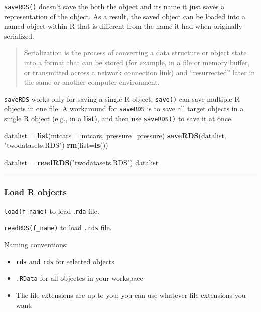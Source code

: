 \documentclass[
  a4paper,
  twoside,
  openright]{book}
\newenvironment{Shaded}{\begin{snugshade}}{\end{snugshade}}
\newcommand{\AttributeTok}[1]{\textcolor[rgb]{0.13,0.29,0.53}{#1}}
\newcommand{\FunctionTok}[1]{\textcolor[rgb]{0.13,0.29,0.53}{\textbf{#1}}}
\newcommand{\NormalTok}[1]{#1}
\newcommand{\OtherTok}[1]{\textcolor[rgb]{0.56,0.35,0.01}{#1}}
\newcommand{\StringTok}[1]{\textcolor[rgb]{0.31,0.60,0.02}{#1}}
\providecommand{\tightlist}{%
  \setlength{\itemsep}{0pt}\setlength{\parskip}{0pt}}
\theoremstyle{definition}
\theoremstyle{definition}
\theoremstyle{definition}
\theoremstyle{definition}
\theoremstyle{remark}
\begin{document}
\texttt{saveRDS()} doesn't save the both the object and its name it just saves a representation of the object. As a result, {the saved object can be loaded into a named object} within R that is different from the name it had when originally serialized.

\begin{quote}
Serialization is the process of converting a data structure or object state into a format that can be stored (for example, in a file or memory buffer, or transmitted across a network connection link) and ``resurrected'' later in the same or another computer environment.
\end{quote}

\texttt{saveRDS} works only for {saving a single R object}, \texttt{save()} can save multiple R objects in one file. A workaround for \texttt{saveRDS} is to save all target objects in a single R object (e.g., in a \textbf{list}), and then use \texttt{saveRDS()} to save it at once.

\begin{Shaded}
\begin{Highlighting}[]
\NormalTok{datalist }\OtherTok{=} \FunctionTok{list}\NormalTok{(}\AttributeTok{mtcars =}\NormalTok{ mtcars, }\AttributeTok{pressure=}\NormalTok{pressure)}
\FunctionTok{saveRDS}\NormalTok{(datalist, }\StringTok{"twodatasets.RDS"}\NormalTok{)}
\FunctionTok{rm}\NormalTok{(}\AttributeTok{list=}\FunctionTok{ls}\NormalTok{())}

\NormalTok{datalist }\OtherTok{=} \FunctionTok{readRDS}\NormalTok{(}\StringTok{"twodatasets.RDS"}\NormalTok{)}
\NormalTok{datalist}
\end{Highlighting}
\end{Shaded}

\begin{center}\rule{0.5\linewidth}{0.5pt}\end{center}

\subsubsection*{Load R objects}\label{load-r-objects}

\texttt{load(f\_name)} to load .\texttt{rda} file.

\texttt{readRDS(f\_name)} to load \texttt{.rds} file.

Naming conventions:

\begin{itemize}
\tightlist
\item
  \texttt{rda} and \texttt{rds} for {selected} objects
\item
  \texttt{.RData} for {all} objectes in your workspace
\item
  The file extensions are up to you; you can use whatever file extensions you want.
\end{itemize}
\end{document}
